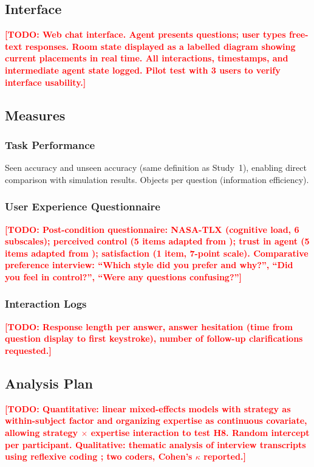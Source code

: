 \documentclass[a4paper,fleqn]{cas-sc}
\newcommand{\TODO}[1]{\textcolor{red}{\textbf{[TODO: #1]}}}
\begin{document}
\subsection{Interface}

\TODO{Web chat interface. Agent presents questions; user types free-text responses. Room state displayed as a labelled diagram showing current placements in real time. All interactions, timestamps, and intermediate agent state logged. Pilot test with 3 users to verify interface usability.}

\subsection{Measures}

\subsubsection{Task Performance}
Seen accuracy and unseen accuracy (same definition as Study~1), enabling direct comparison with simulation results. Objects per question (information efficiency).

\subsubsection{User Experience Questionnaire}
\TODO{Post-condition questionnaire: NASA-TLX (cognitive load, 6 subscales); perceived control (5 items adapted from \citealt{skjuve2025chatgpt}); trust in agent (5 items adapted from \citealt{mahmood2025user}); satisfaction (1 item, 7-point scale). Comparative preference interview: ``Which style did you prefer and why?'', ``Did you feel in control?'', ``Were any questions confusing?''}

\subsubsection{Interaction Logs}
\TODO{Response length per answer, answer hesitation (time from question display to first keystroke), number of follow-up clarifications requested.}

\subsection{Analysis Plan}

\TODO{Quantitative: linear mixed-effects models with strategy as within-subject factor and organizing expertise as continuous covariate, allowing strategy $\times$ expertise interaction to test H8. Random intercept per participant. Qualitative: thematic analysis of interview transcripts using reflexive coding \citep{braun2019thematic}; two coders, Cohen's $\kappa$ reported.}
\end{document}
